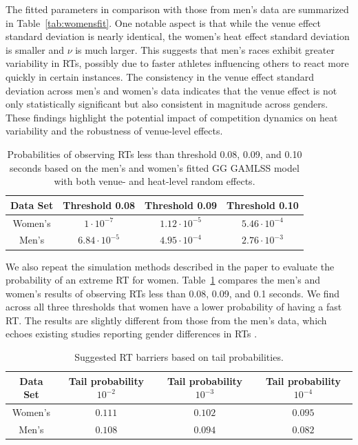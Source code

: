 \documentclass[12pt, letterpaper]{article}
\begin{document}
The fitted parameters in comparison with those from men's data are
summarized in Table~\ref{tab:womensfit}.  One notable aspect is that while
the venue effect standard deviation is nearly identical, the women's heat effect
standard deviation is smaller and $\nu$ is much larger.
This suggests that men’s races exhibit greater 
variability in RTs, possibly due to faster athletes influencing others 
to react more quickly in certain instances. The consistency in the venue effect 
standard deviation across men’s and women’s data indicates that the venue effect 
is not only statistically significant but also consistent in magnitude across 
genders. These findings highlight the potential impact of competition dynamics 
on heat variability and the robustness of venue-level effects.


\begin{table}
  \centering
  \caption{Probabilities of observing RTs less than threshold 0.08,
  0.09, and 0.10 seconds based on the men's and women's
    fitted GG GAMLSS model with both venue- and heat-level
random effects.}
  \begin{tabular}{c c c c}
   \toprule
   Data Set & Threshold 0.08 & Threshold 0.09 & Threshold 0.10  \\
   \midrule
   Women's & $1\cdot10^{-7}$ & $1.12\cdot10^{-5}$ &  $5.46\cdot10^{-4}$  \\
   Men's   & $6.84\cdot10^{-5}$ & $4.95\cdot10^{-4}$ & $2.76\cdot10^{-3}$ \\
   \bottomrule
  \end{tabular}
  \label{tab:Sim_prob_women}
\end{table}

We also repeat the simulation methods described in the paper to evaluate
the probability of an extreme RT for women.  Table~\ref{tab:Sim_prob_women}
compares the men's and women's results of observing RTs less than
0.08, 0.09, and 0.1 seconds.  We find across all three thresholds that
women have a lower probability of having a fast RT. The results are slightly
different from those from the men's data, which echoes existing studies
reporting gender differences in RTs \citep[e.g.,][]{lipps2011implications,
babicc2009reaction, panoutsakopoulos2020gender}.



\begin{table}
  \centering
  \caption{Suggested RT barriers based on tail probabilities.}
  \begin{tabular}{c c c c}
   \toprule
   Data Set & Tail probability  $10^{-2}$ & Tail probability  $10^{-3}$ & Tail probability $10^{-4}$ \\
   \midrule
   Women's & $0.111$ & $0.102$ & $0.095$ \\
   Men's   & $0.108$ & $0.094$ & $0.082$ \\
   \bottomrule
  \end{tabular}
  \label{tab:Sim_time_women}
\end{table}
\end{document}

